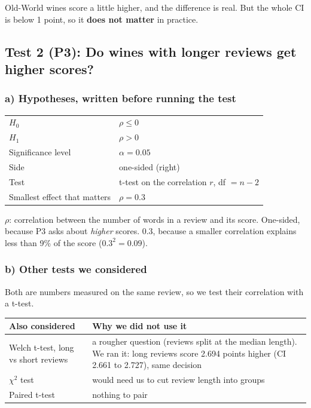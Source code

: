 \documentclass[10pt,a4paper,twocolumn]{article}
\begin{document}
Old-World wines score a little higher, and the difference is real. But the whole CI is below 1 point, so it
\textbf{does not matter} in practice.

\subsection*{Test 2 (P3): Do wines with longer reviews get higher scores?}

\subsubsection*{a) Hypotheses, written before running the test}
{\small
\begin{tabularx}{\columnwidth}{@{}HL@{}}
\toprule
$H_0$ & $\rho \leq 0$\\
$H_1$ & $\rho > 0$\\
Significance level & $\alpha = 0.05$\\
Side & one-sided (right)\\
Test & t-test on the correlation $r$, df $= n - 2$\\
Smallest effect that matters & $\rho = 0.3$\\
\bottomrule
\end{tabularx}\par}

$\rho$: correlation between the number of words in a review and its score. One-sided, because P3 asks about
\emph{higher} scores. 0.3, because a smaller correlation explains less than 9\% of the score ($0.3^2 = 0.09$).

\subsubsection*{b) Other tests we considered}
Both are numbers measured on the same review, so we test their correlation with a t-test.

{\footnotesize
\begin{tabularx}{\columnwidth}{@{}P{23mm}L@{}}
\toprule
\textbf{Also considered} & \textbf{Why we did not use it}\\
\midrule
Welch t-test, long vs short reviews & a rougher question (reviews split at the median length). We ran it: long reviews
score 2.694 points higher (CI 2.661 to 2.727), same decision\\
$\chi^2$ test & would need us to cut review length into groups\\
Paired t-test & nothing to pair\\
\bottomrule
\end{tabularx}\par}
\end{document}

